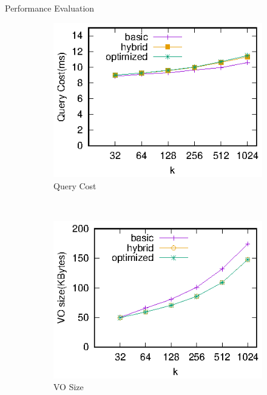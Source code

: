 \documentclass[xcolor={dvipsnames},aspectratio=169,10pt]{beamer}
\begin{document}
\begin{frame}{Performance Evaluation}
  \begin{figure}
    \centering
    \begin{subfigure}[t]{.33\linewidth}
      \centering
      \includegraphics[width=\linewidth]{exp-figs/knn/querycost.eps}
      \caption{Query Cost}
    \end{subfigure}~%
    \begin{subfigure}[t]{.33\linewidth}
      \centering
      \includegraphics[width=\linewidth]{exp-figs/knn/vosize.eps}
      \caption{VO Size}
    \end{subfigure}~%
    \begin{subfigure}[t]{.33\linewidth}
      \centering

\end{subfigure}
\end{figure}
\end{frame}
\end{document}
